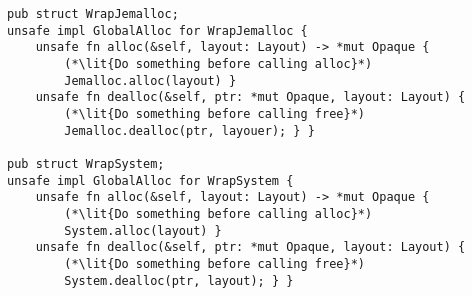 \begin{lstlisting}[style=Rust,
caption=Custom allocators wrapping jemalloc and the system allocator]
pub struct WrapJemalloc;
unsafe impl GlobalAlloc for WrapJemalloc {
    unsafe fn alloc(&self, layout: Layout) -> *mut Opaque {
        (*\lit{Do something before calling alloc}*)
        Jemalloc.alloc(layout) }
    unsafe fn dealloc(&self, ptr: *mut Opaque, layout: Layout) {
        (*\lit{Do something before calling free}*)
        Jemalloc.dealloc(ptr, layouer); } }

pub struct WrapSystem;
unsafe impl GlobalAlloc for WrapSystem {
    unsafe fn alloc(&self, layout: Layout) -> *mut Opaque {
        (*\lit{Do something before calling alloc}*)
        System.alloc(layout) }
    unsafe fn dealloc(&self, ptr: *mut Opaque, layout: Layout) {
        (*\lit{Do something before calling free}*)
        System.dealloc(ptr, layout); } }
\end{lstlisting}
